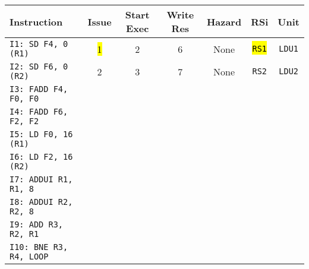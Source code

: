 \begin{table}[!htp]
    \centering
    \begin{adjustbox}{width={\textwidth},totalheight={\textheight},keepaspectratio}
    \begin{tabular}{@{} l c c c c c c @{}}
        \toprule
        \textbf{Instruction} & \textbf{Issue} & \textbf{Start Exec} & \textbf{Write Res} & \textbf{Hazard} & \textbf{RSi} & \textbf{Unit} \\
        \midrule
        \texttt{I1: SD F4, 0 (R1)}      & \hl{1} & 2 & 6 & None  & \hl{\texttt{RS1}}   & \texttt{LDU1}  \\ [.5em]
        \texttt{I2: SD F6, 0 (R2)}      & 2 & 3 & 7 & None  & \texttt{RS2}   & \texttt{LDU2}  \\ [.5em]
        \texttt{I3: FADD F4, F0, F0}    &   &   &   &       &       &       \\ [.5em]
        \texttt{I4: FADD F6, F2, F2}    &   &   &   &       &       &       \\ [.5em]
        \texttt{I5: LD F0, 16 (R1)}     &   &   &   &       &       &       \\ [.5em]
        \texttt{I6: LD F2, 16 (R2)}     &   &   &   &       &       &       \\ [.5em]
        \texttt{I7: ADDUI R1, R1, 8}    &   &   &   &       &       &       \\ [.5em]
        \texttt{I8: ADDUI R2, R2, 8}    &   &   &   &       &       &       \\ [.5em]
        \texttt{I9: ADD R3, R2, R1}     &   &   &   &       &       &       \\ [.5em]
        \texttt{I10: BNE R3, R4, LOOP}   &   &   &   &       &       &       \\
        \bottomrule
    \end{tabular}
    \end{adjustbox}
\end{table}

